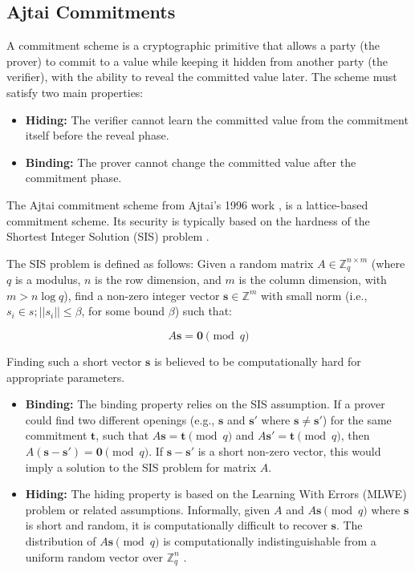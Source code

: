 \subsection{Ajtai Commitments}

A commitment scheme is a cryptographic primitive that allows a party (the
prover) to commit to a value while keeping it hidden from another party (the
verifier), with the ability to reveal the committed value later. The scheme
must satisfy two main properties:
\begin{itemize}
    \item \textbf{Hiding:} The verifier cannot learn the committed value from
		the commitment itself before the reveal phase.
    \item \textbf{Binding:} The prover cannot change the committed value after
		the commitment phase.
\end{itemize}

The Ajtai commitment scheme from Ajtai's 1996 work \cite{AjtaiLattices}, is a
lattice-based commitment scheme. Its security is typically based on the
hardness of the Shortest Integer Solution (SIS) problem \cite{AjtaiLattices, LatticeTutorial}.

The SIS problem is defined as follows: Given a random matrix
$A \in \mathbb{Z}_q^{n \times m}$ (where $q$ is a modulus, $n$ is the row
dimension, and $m$ is the column dimension, with $m > n \log q$), find a
non-zero integer vector $\mathbf{s} \in \mathbb{Z}^m$ with small norm (i.e.,
$s_i \in s; ||s_i|| \leq \beta$, for some bound $\beta$) such that:

\[
	A\mathbf{s} = \mathbf{0} \pmod{q}
\]

Finding such a short vector $\mathbf{s}$ is believed to be computationally
hard for appropriate parameters.

\begin{itemize}
    \item \textbf{Binding:} The binding property relies on the SIS assumption.
		If a prover could find two different openings (e.g., $\mathbf{s}$ and
		$\mathbf{s}'$ where $\mathbf{s} \neq \mathbf{s}'$) for the same
		commitment $\mathbf{t}$, such that $A\mathbf{s} = \mathbf{t} \pmod{q}$
		and $A\mathbf{s}' = \mathbf{t} \pmod{q}$, then $A(\mathbf{s} -
		\mathbf{s}') = \mathbf{0} \pmod{q}$. If $\mathbf{s} - \mathbf{s}'$ is
		a short non-zero vector, this would imply a solution to the SIS
		problem for matrix $A$.
    \item \textbf{Hiding:} The hiding property is based on the Learning With
		Errors (MLWE) problem or related assumptions. Informally, given $A$ and
		$A\mathbf{s} \pmod{q}$ where $\mathbf{s}$ is short and random, it is
		computationally difficult to recover $\mathbf{s}$. The distribution of
		$A\mathbf{s} \pmod{q}$ is computationally indistinguishable from a
		uniform random vector over $\mathbb{Z}_q^n$ \cite{LatticesInZKP}.
\end{itemize}

